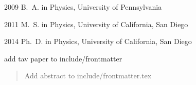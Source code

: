 \begin{frontmatter}
\begin{vitapage}                                                               
\begin{vita}                                                                   
  \item[2009] B.~A. in Physics, University of Pennsylvania
  \item[2011] M.~S. in Physics, University of California, San Diego
  \item[2014] Ph.~D. in Physics, University of California, San Diego       
\end{vita}                                                                     
\begin{publications}                                                           
 \item add tav paper to include/frontmatter
\end{publications}                                                             
\end{vitapage}                                                                 
                                                                               

\begin{abstract}

Add abstract to include/frontmatter.tex

\end{abstract}


\end{frontmatter}
